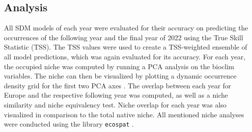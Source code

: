 \documentclass[12pt,a4paper]{article}
\begin{document}
\subsection{Analysis}
All SDM models of each year were evaluated for their accuracy on predicting the occurrences of the following year and the final year of 2022 using the True Skill Statistic (TSS).
The TSS values were used to create a TSS-weighted ensemble of all model predictions, which was again evaluated for its accuracy.
For each year, the occupied niche was computed by running a PCA analysis on the bioclim variables.
The niche can then be visualized by plotting a dynamic occurrence density grid for the first two PCA axes \autocite{broennimann2012niche}.
The overlap between each year for Europe and the respective following year was computed, as well as a niche similarity and niche equivalency test.
Niche overlap for each year was also visualized in comparison to the total native niche.
All mentioned niche analyses were conducted using the library \texttt{ecospat} \autocite{dicola2017ecospat}.



\newpage
\printbibliography[]

\end{document}
